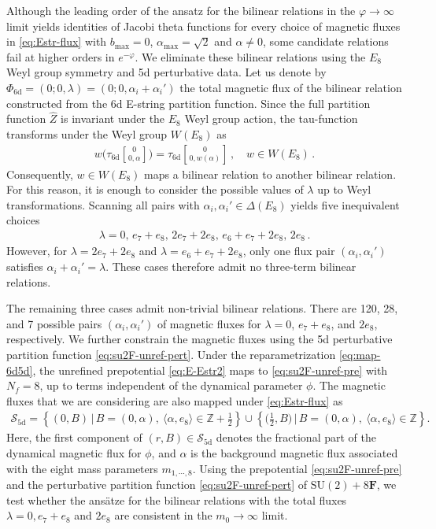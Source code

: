 \documentclass[11pt, a4paper]{article}
\newcommand{\tauftnd}[2]{\tau_{\mathrm{6d}}\genfrac[]{0pt}{1}{#1}{#2}}
\theoremstyle{definition}
\begin{document}
Although the leading order of the ansatz for the bilinear relations in the $ \varphi\to \infty $ limit yields identities of Jacobi theta functions for every choice of magnetic fluxes in \eqref{eq:Estr-flux} with $ b_{\mathrm{max}}=0 $, $ \alpha_{\mathrm{max}}=\sqrt{2} $ and $ \alpha \neq 0 $, some candidate relations fail at higher orders in $ e^{-\varphi} $. We eliminate these bilinear relations using the $ E_8 $ Weyl group symmetry and 5d perturbative data. Let us denote by $ \Phi_{\mathrm{6d}} = (0; 0, \lambda) = (0; 0, \alpha_i + \alpha_i') $ the total magnetic flux of the bilinear relation constructed from the 6d E-string partition function. Since the full partition function $ \hat{Z} $ is invariant under the $ E_8 $ Weyl group action, the tau-function transforms under the Weyl group $ W(E_8) $ as
\begin{align}
    w\Big(\tauftnd{0}{0,\alpha}\Big) = \tauftnd{0}{0,w(\alpha)} \, , \quad w \in W(E_8) \, .
\end{align}
Consequently, $ w \in W(E_8) $ maps a bilinear relation to another bilinear relation. For this reason, it is enough to consider the possible values of $ \lambda $ up to Weyl transformations. Scanning all pairs with $ \alpha_i, \alpha_i' \in \Delta(E_8) $ yields five inequivalent choices
\begin{align}
    \lambda = 0, \, e_7+e_8 , \, 2e_7+2e_8 , \, e_6+e_7+2e_8 , \, 2e_8 \, .
\end{align}
However, for $ \lambda=2e_7+2e_8 $ and $ \lambda=e_6+e_7+2e_8 $, only one flux pair $ (\alpha_i, \alpha_i') $ satisfies $ \alpha_i+\alpha_i' = \lambda $. These cases therefore admit no three-term bilinear relations.

The remaining three cases admit non-trivial bilinear relations. There are 120, 28, and 7 possible pairs $ (\alpha_i, \alpha_i') $ of magnetic fluxes for $ \lambda=0 $, $ e_7+e_8 $, and $ 2e_8 $, respectively. We further constrain the magnetic fluxes using the 5d perturbative partition function \eqref{eq:su2F-unref-pert}. Under the reparametrization \eqref{eq:map-6d5d}, the unrefined prepotential \eqref{eq:E-Estr2} maps to \eqref{eq:su2F-unref-pre} with $ N_f=8 $, up to terms independent of the dynamical parameter $ \phi $. The magnetic fluxes that we are considering are also mapped under \eqref{eq:Estr-flux} as
\begin{align}\label{eq:8F-flux}
    \mathcal{S}_{\text{5d}} = \left\{ (0,B) \, \bigg| \, 
    B = (0, \alpha) , \ \langle \alpha, e_8 \rangle \in \mathbb{Z}+\frac{1}{2} \right\} \cup
    \left\{ \Big( \frac{1}{2},B \Big) \, \bigg| \, B=(0, \alpha) , \ \langle \alpha, e_8 \rangle \in \mathbb{Z}  \right\} .
\end{align}
Here, the first component of $ (r,B) \in \mathcal{S}_{\text{5d}} $ denotes the fractional part of the dynamical magnetic flux for $ \phi $, and $ \alpha $ is the background magnetic flux associated with the eight mass parameters $ m_{1,\cdots,8} $. Using the prepotential \eqref{eq:su2F-unref-pre} and the perturbative partition function \eqref{eq:su2F-unref-pert} of $ \mathrm{SU}(2)+8\mathbf{F} $, we test whether the ans\"atze for the bilinear relations with the total fluxes $ \lambda=0, e_7+e_8 $ and $ 2e_8 $ are consistent in the $ m_0\to \infty $ limit.
\end{document}
